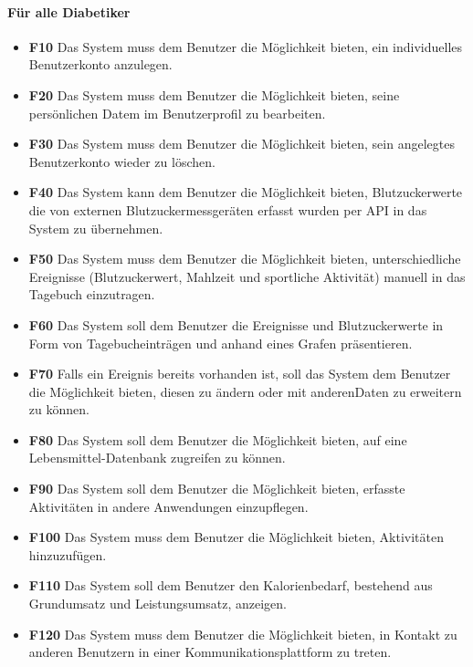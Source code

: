	\paragraph{Für alle Diabetiker}\mbox{}
	\begin{itemize}
		\item\textbf{\lbrack F10\rbrack} Das System muss dem Benutzer die Möglichkeit bieten, ein individuelles Benutzerkonto anzulegen.
		\item\textbf{\lbrack F20\rbrack} Das System muss dem Benutzer die Möglichkeit bieten, seine persönlichen Datem im Benutzerprofil zu bearbeiten.
		\item\textbf{\lbrack F30\rbrack} Das System muss dem Benutzer die Möglichkeit bieten, sein angelegtes Benutzerkonto wieder zu löschen.
		\item\textbf{\lbrack F40\rbrack} Das System kann dem Benutzer die Möglichkeit bieten, Blutzuckerwerte die von externen Blutzuckermessgeräten erfasst wurden per API in das System zu übernehmen.
		\item\textbf{\lbrack F50\rbrack} Das System muss dem Benutzer die Möglichkeit bieten, unterschiedliche Ereignisse (Blutzuckerwert, Mahlzeit und sportliche Aktivität) manuell in das Tagebuch einzutragen.
		\item\textbf{\lbrack F60\rbrack} Das System soll dem Benutzer die Ereignisse und Blutzuckerwerte in Form von Tagebucheinträgen und anhand eines Grafen präsentieren.
		\item\textbf{\lbrack F70\rbrack} Falls ein Ereignis bereits vorhanden ist, soll das System dem Benutzer die Möglichkeit bieten, diesen zu ändern oder mit anderenDaten zu erweitern zu können.
		\item\textbf{\lbrack F80\rbrack} Das System soll dem Benutzer die Möglichkeit bieten, auf eine Lebensmittel-Datenbank zugreifen zu können.
		\item\textbf{\lbrack F90\rbrack} Das System soll dem Benutzer die Möglichkeit bieten, erfasste Aktivitäten in andere Anwendungen einzupflegen.
		\item\textbf{\lbrack F100\rbrack} Das System muss dem Benutzer die Möglichkeit bieten, Aktivitäten hinzuzufügen.
		\item\textbf{\lbrack F110\rbrack} Das System soll dem Benutzer den Kalorienbedarf, bestehend aus Grundumsatz und Leistungsumsatz, anzeigen.
		\item\textbf{\lbrack F120\rbrack} Das System muss dem Benutzer die Möglichkeit bieten, in Kontakt zu anderen Benutzern in einer Kommunikationsplattform zu treten.

\end{itemize}
